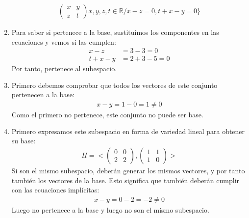 \documentclass{article}
\begin{document}
\begin{enumerate}[label = (\alph*)]
\begin{equation}
\begin{split}
\begin{pmatrix}
            x & y \\ z & t
            \end{pmatrix} x,y,z,t \in \mathbb{R} / x-z = 0, t +x -y = 0 \}
        \end{split}
    \end{equation}
    \item 
    Para saber si pertenece a la base, sustituimos los componentes en las ecuaciones y vemos si las cumplen:
    \begin{equation}
        \begin{split}
            x-z &= 3 - 3 = 0\\
            t+x-y &= 2 + 3 - 5 = 0
        \end{split}
    \end{equation}
    Por tanto, pertenece al subespacio.
    \item
    Primero debemos comprobar que todos los vectores de este conjunto pertenecen a la base:
    \begin{equation}
        \begin{split}
            x-y = 1- 0 = 1 \neq 0
        \end{split}
    \end{equation}
    Como el primero no pertenece, este conjunto no puede ser base.
    \item
    Primero expresamos este subespacio en forma de variedad lineal para obtener su base:
    \begin{equation}
        \begin{split}
            H = < \begin{pmatrix}
            0 & 0 \\2 & 2
            \end{pmatrix}, \begin{pmatrix}
            1 & 1 \\1 & 0
            \end{pmatrix}>
        \end{split}
    \end{equation}
    Si son el mismo subespacio, deberán generar los mismos vectores, y por tanto también los vectores de la base. Esto significa que
    también deberán cumplir con las ecuaciones implícitas:
    \begin{equation}
        \begin{split}
            x-y = 0-2 = -2 \neq 0
        \end{split}
    \end{equation}
    Luego no pertenece a la base y luego no son el mismo subespacio.
\end{enumerate}
\end{document}
